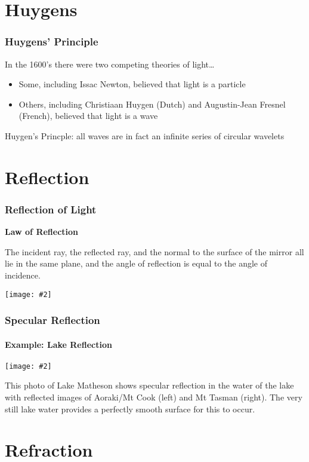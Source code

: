 \documentclass[compress,aspectratio=169]{beamer}
\newcommand{\pic}[2]{\texttt{[image: \#2]}}
\begin{document}
\section{Huygens}
\begin{frame}
  \frametitle{Huygens' Principle}
  In the 1600's there were two competing theories of light\ldots
  \begin{itemize}
  \item Some, including Issac Newton, believed that  light is a particle
  \item Others, including Christiaan Huygen (Dutch) and Augustin-Jean Fresnel
    (French), believed that light is a wave
  \end{itemize}
  \vspace{.4in}

  Huygen's Princple: all waves are in fact an infinite series of circular
  wavelets
\end{frame}

\section{Reflection}
\begin{frame}
  \frametitle{Reflection of Light}
  \textbf{Law of Reflection}
  
  The incident ray, the reflected ray, and the normal to the surface of the
  mirror all lie in the same plane, and the angle of reflection is equal to
  the angle of incidence.  
  \begin{center}
    \pic{.7}{Types-of-reflection.jpg}
  \end{center}
\end{frame}

\begin{frame}
  \frametitle{Specular Reflection}
  \framesubtitle{Example: Lake Reflection}
  \begin{center}
    \pic{.55}{Lake-reflection.jpg}
  \end{center}
  This photo of Lake Matheson shows specular reflection in the water of the
  lake with reflected images of Aoraki/Mt Cook (left) and Mt Tasman (right).
  The very still lake water provides a perfectly smooth surface for this to
  occur.
\end{frame}

\section{Refraction}
\end{document}

